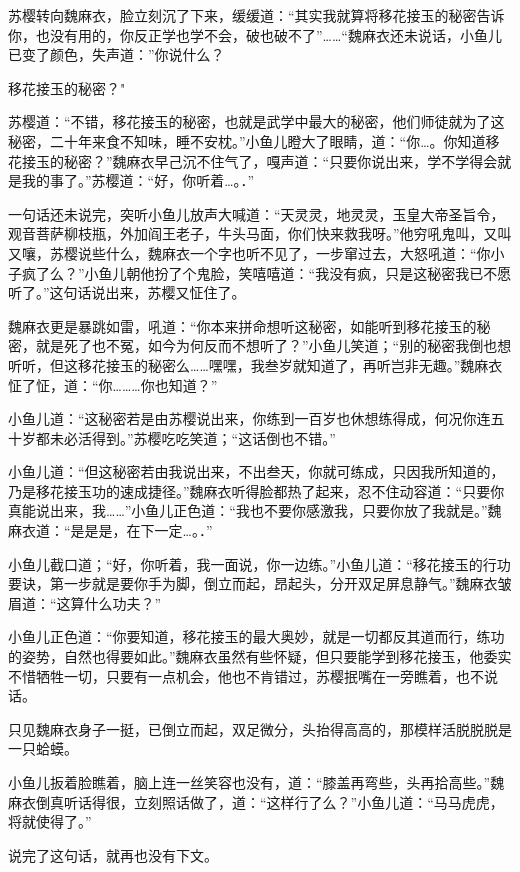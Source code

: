 \documentclass[12pt,oneside]{book}
\begin{document}
苏樱转向魏麻衣，脸立刻沉了下来，缓缓道：``其实我就算将移花接玉的秘密告诉你，也没有用的，你反正学也学不会，破也破不了''\ldots\ldots{}``魏麻衣还未说话，小鱼儿已变了颜色，失声道：''你说什么？

移花接玉的秘密？"

苏樱道：``不错，移花接玉的秘密，也就是武学中最大的秘密，他们师徒就为了这秘密，二十年来食不知味，睡不安枕。''小鱼儿瞪大了眼睛，道：``你\ldots。你知道移花接玉的秘密？''魏麻衣早己沉不住气了，嘎声道：``只要你说出来，学不学得会就是我的事了。''苏樱道：``好，你听着\ldots。．''

一句话还未说完，突听小鱼儿放声大喊道：``天灵灵，地灵灵，玉皇大帝圣旨令，观音菩萨柳枝瓶，外加阎王老子，牛头马面，你们快来救我呀。''他穷吼鬼叫，又叫又嚷，苏樱说些什么，魏麻衣一个字也听不见了，一步窜过去，大怒吼道：``你小子疯了么？''小鱼儿朝他扮了个鬼脸，笑嘻嘻道：``我没有疯，只是这秘密我已不愿听了。''这句话说出来，苏樱又怔住了。

魏麻衣更是暴跳如雷，吼道：``你本来拼命想听这秘密，如能听到移花接玉的秘密，就是死了也不冤，如今为何反而不想听了？''小鱼儿笑道；``别的秘密我倒也想听听，但这移花接玉的秘密么\ldots\ldots 嘿嘿，我叁岁就知道了，再听岂非无趣。''魏麻衣怔了怔，道：``你\ldots\ldots\ldots 你也知道？''

小鱼儿道：``这秘密若是由苏樱说出来，你练到一百岁也休想练得成，何况你连五十岁都未必活得到。''苏樱吃吃笑道；``这话倒也不错。''

小鱼儿道：``但这秘密若由我说出来，不出叁天，你就可练成，只因我所知道的，乃是移花接玉功的速成捷径。''魏麻衣听得脸都热了起来，忍不住动容道：``只要你真能说出来，我\ldots\ldots{}''小鱼儿正色道：``我也不要你感激我，只要你放了我就是。''魏麻衣道：``是是是，在下一定\ldots。．''

小鱼儿截口道；``好，你听着，我一面说，你一边练。''小鱼儿道：``移花接玉的行功要诀，第一步就是要你手为脚，倒立而起，昂起头，分开双足屏息静气。''魏麻衣皱眉道：``这算什么功夫？''

小鱼儿正色道：``你要知道，移花接玉的最大奥妙，就是一切都反其道而行，练功的姿势，自然也得要如此。''魏麻衣虽然有些怀疑，但只要能学到移花接玉，他委实不惜牺牲一切，只要有一点机会，他也不肯错过，苏樱抿嘴在一旁瞧着，也不说话。

只见魏麻衣身子一挺，已倒立而起，双足微分，头抬得高高的，那模样活脱脱脱是一只蛤蟆。

小鱼儿扳着脸瞧着，脑上连一丝笑容也没有，道：``膝盖再弯些，头再拾高些。''魏麻衣倒真听话得很，立刻照话做了，道：``这样行了么？''小鱼儿道：``马马虎虎，将就使得了。''

说完了这句话，就再也没有下文。
\end{document}
